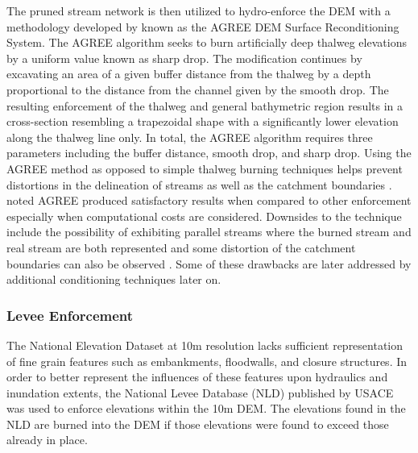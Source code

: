 The pruned stream network is then utilized to hydro-enforce the DEM with a methodology developed by  known as the AGREE DEM Surface Reconditioning System. 
The AGREE algorithm seeks to burn artificially deep thalweg elevations by a uniform value known as sharp drop. 
The modification continues by excavating an area of a given buffer distance from the thalweg by a depth proportional to the distance from the channel given by the smooth drop. 
The resulting enforcement of the thalweg and general bathymetric region results in a cross-section resembling a trapezoidal shape with a significantly lower elevation along the thalweg line only.
In total, the AGREE algorithm requires three parameters including the buffer distance, smooth drop, and sharp drop. 
Using the AGREE method as opposed to simple thalweg burning techniques helps prevent distortions in the delineation of streams as well as the catchment boundaries \cite{saunders1995grid,saunders1996gis,mizgalewicz1996modeling,hellweger1997agree,quenzer1998gis,baker2006comparison}.
 noted AGREE produced satisfactory results when compared to other enforcement especially when computational costs are considered. 
Downsides to the technique include the possibility of exhibiting parallel streams where the burned stream and real stream are both represented \cite{hellweger1997agree,saunders1999preparation} and some distortion of the catchment boundaries can also be observed \cite{saunders1999preparation,saunders1996gis}. Some of these drawbacks are later addressed by additional conditioning techniques later on.
%
\subsubsection{Levee Enforcement}
%
The National Elevation Dataset at 10m resolution lacks sufficient representation of fine grain features such as embankments, floodwalls, and closure structures.
In order to better represent the influences of these features upon hydraulics and inundation extents, the National Levee Database (NLD) published by USACE was used to enforce elevations within the 10m DEM.
The elevations found in the NLD are burned into the DEM if those elevations were found to exceed those already in place.
%
